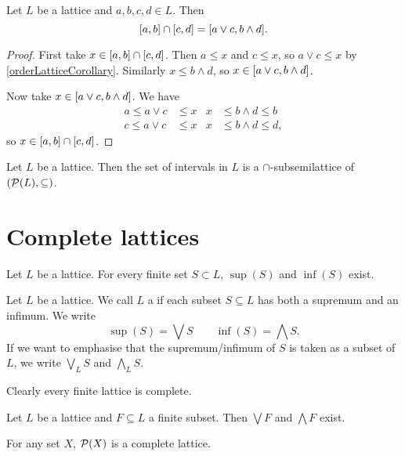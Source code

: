 \begin{proposition} \label{latticeIntervalIntersection}
Let $L$ be a lattice and $a,b,c,d\in L$. Then
\[ \interval{a,b} \cap \interval{c,d} = \interval{a\vee c, b\wedge d}. \]
\end{proposition}
\begin{proof}
First take $x\in \interval{a,b} \cap \interval{c,d}$. Then $a\leq x$ and $c\leq x$, so $a\vee c \leq x$ by \ref{orderLatticeCorollary}. Similarly $x\leq b\wedge d$, so $x\in\interval{a\vee c, b\wedge d}$.

Now take $x\in\interval{a\vee c, b\wedge d}$. We have
\begin{align*}
a\leq a\vee c &\leq x &  x&\leq b\wedge d \leq b \\
c\leq a\vee c &\leq x &  x&\leq b\wedge d \leq d,
\end{align*}
so $x\in \interval{a,b} \cap \interval{c,d}$.
\end{proof}
\begin{corollary}
Let $L$ be a lattice. Then the set of intervals in $L$ is a $\cap$-subsemilattice of $\sSet{\powerset(L), \subseteq}$.
\end{corollary}

\section{Complete lattices}
\begin{lemma}
Let $L$ be a lattice. For every finite set $S\subset L$, $\sup(S)$ and $\inf(S)$ exist.
\end{lemma}
\begin{definition}
Let $L$ be a lattice. We call $L$ a  if each subset $S\subseteq L$ has both a supremum and an infimum. We write
\[ \sup(S) = \bigvee S \qquad \inf(S) = \bigwedge S. \]
If we want to emphasise that the supremum/infimum of $S$ is taken as a subset of $L$, we write $\bigvee_L S$ and $\bigwedge_L S$.
\end{definition}
Clearly every finite lattice is complete.

\begin{lemma} \label{supInfFiniteSubsetsLattice}
Let $L$ be a lattice and $F\subseteq L$ a finite subset. Then $\bigvee F$ and $\bigwedge F$ exist. 
\end{lemma}

\begin{example}
For any set $X$, $\operatorname{\mathcal{P}}(X)$ is a complete lattice.
\end{example}

